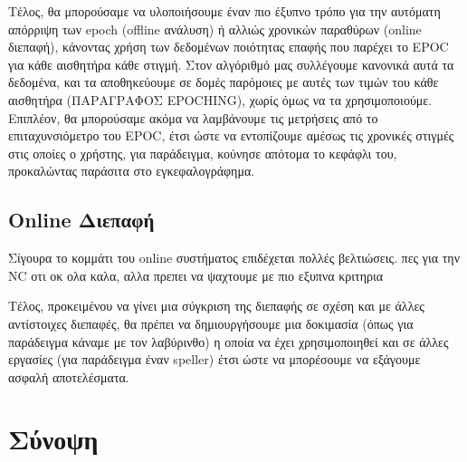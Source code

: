 \documentclass[11pt,a4paper,english,greek,twoside]{../Thesis}
\begin{document}
\par Τέλος, θα μπορούσαμε να υλοποιήσουμε έναν πιο έξυπνο τρόπο για την αυτόματη απόρριψη των epoch (offline ανάλυση) ή αλλιώς χρονικών παραθύρων (online διεπαφή), κάνοντας χρήση των δεδομένων ποιότητας επαφής που παρέχει το EPOC για κάθε αισθητήρα κάθε στιγμή. Στον αλγόριθμό μας συλλέγουμε κανονικά αυτά τα δεδομένα, και τα αποθηκεύουμε σε δομές παρόμοιες με αυτές των τιμών του κάθε αισθητήρα (ΠΑΡΑΓΡΑΦΟΣ EPOCHING), χωρίς όμως να τα χρησιμοποιούμε. Επιπλέον, θα μπορούσαμε ακόμα να λαμβάνουμε τις μετρήσεις από το επιταχυνσιόμετρο του EPOC, έτσι ώστε να εντοπίζουμε αμέσως τις χρονικές στιγμές στις οποίες ο χρήστης, για παράδειγμα, κούνησε απότομα το κεφάφλι του, προκαλώντας παράσιτα στο εγκεφαλογράφημα.

\subsection{Online Διεπαφή}
\par Σίγουρα το κομμάτι του online συστήματος επιδέχεται πολλές βελτιώσεις. πες για την NC οτι οκ ολα καλα, αλλα πρεπει να ψαχτουμε με πιο εξυπνα κριτηρια

\par Τέλος, προκειμένου να γίνει μια σύγκριση της διεπαφής σε σχέση και με άλλες αντίστοιχες διεπαφές, θα πρέπει να δημιουργήσουμε μια δοκιμασία (όπως για παράδειγμα κάναμε με τον λαβύρινθο) η οποία να έχει χρησιμοποιηθεί και σε άλλες εργασίες (για παράδειγμα έναν speller) έτσι ώστε να μπορέσουμε να εξάγουμε ασφαλή αποτελέσματα.

\section{Σύνοψη}
\end{document}
